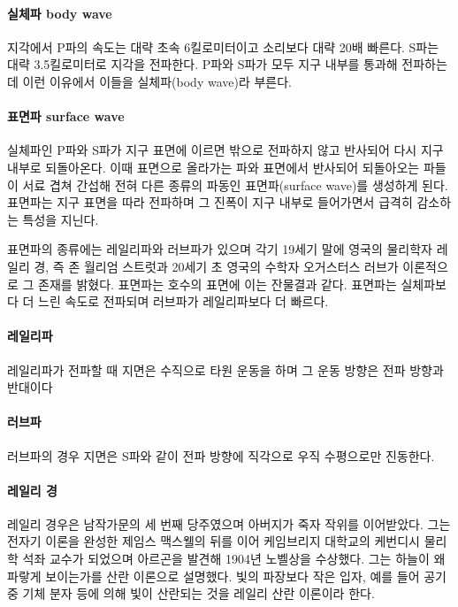 \documentclass[12pt, a4paper, oneside]{book}
\begin{document}
		\paragraph{실체파 body wave}	
		지각에서 P파의 속도는 대략 초속 6킬로미터이고 소리보다 대략 20배 빠른다. 
		S파는 대략 3.5킬로미터로 지각을 전파한다. 
		P파와 S파가 모두 지구 내부를 통과해 전파하는데 이런 이유에서 이들을 실체파(body wave)라 부른다.
		


		\paragraph{표면파 surface wave}	
		실체파인 P파와 S파가 지구 표면에 이르면 밖으로 전파하지 않고 반사되어 다시 지구 내부로 되돌아온다.
		이때 표면으로 올라가는 파와 표면에서 반사되어 되돌아오는 파들이 서료 겹쳐 간섭해 전혀 다른 종류의 파동인 표면파(surface wave)를 생성하게 된다. 
		표면파는 지구 표면을 따라 전파하며 그 진폭이 지구 내부로 들어가면서 급격히 감소하는 특성을 지닌다.
		
		표면파의 종류에는 레일리파와 러브파가 있으며 각기 19세기 말에 영국의 물리학자 레일리 경, 즉 존 월리엄 스트럿과 20세기 초 영국의 수학자 오거스터스 러브가 이론적으로 그 존재를 밝혔다.
		표면파는 호수의 표면에 이는 잔물결과 같다.
		표면파는 실체파보다 더 느린 속도로 전파되며 러브파가 레일리파보다 더 빠르다.
		
		\paragraph{레일리파}
		레일리파가 전파할 때 지면은 수직으로 타원 운동을 하며 그 운동 방향은 전파 방향과 반대이다 
			
		\paragraph{러브파}
		러브파의 경우 지면은 S파와 같이 전파 방향에 직각으로 우직 수평으로만 진동한다.
		

		\paragraph{레일리 경}
		레일리 경우은 남작가문의 세 번째 당주였으며 아버지가 죽자 작위를 이어받았다.
		그는 전자기 이론을 완성한 제임스 맥스웰의 뒤를 이어 케임브리지 대학교의 케번디시 물리학 석좌 교수가 되었으며 아르곤을 발견해 1904년 노벨상을 수상했다. 그는 하늘이 왜 파랗게 보이는가를 산란 이론으로 설명했다. 빛의 파장보다 작은 입자, 예를 들어 공기 중 기체 분자 등에 의해 빛이 산란되는 것을 레일리 산란 이론이라 한다.
		
\end{document}
